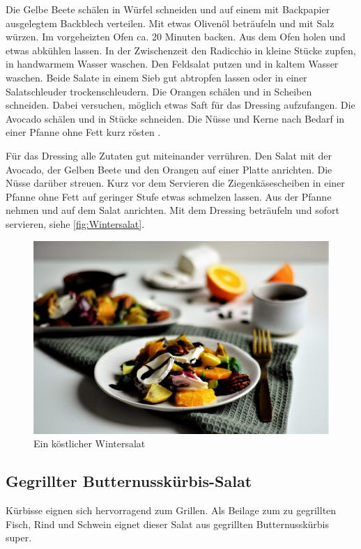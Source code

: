 Die Gelbe Beete schälen in Würfel schneiden und auf einem mit Backpapier 
ausgelegtem Backblech verteilen. Mit etwas Olivenöl beträufeln und 
mit Salz würzen. Im vorgeheizten Ofen ca. 20 Minuten backen. Aus dem Ofen 
holen und etwas abkühlen lassen. In der Zwischenzeit den Radicchio
in kleine Stücke zupfen, in handwarmem Wasser waschen. Den Feldsalat 
putzen und in kaltem Wasser waschen. Beide Salate in einem Sieb gut
abtropfen lassen oder in einer Salatschleuder trockenschleudern. Die Orangen 
schälen und in Scheiben schneiden. Dabei versuchen, möglich etwas
Saft für das Dressing aufzufangen. Die Avocado schälen und in Stücke 
schneiden. Die Nüsse und Kerne nach Bedarf in einer Pfanne ohne Fett kurz 
rösten .

Für das Dressing alle Zutaten gut miteinander verrühren. Den Salat mit der 
Avocado, der Gelben Beete und den Orangen auf einer Platte anrichten. 
Die Nüsse darüber streuen. Kurz vor dem Servieren die Ziegenkäsescheiben in 
einer Pfanne ohne Fett auf geringer Stufe etwas schmelzen lassen. 
Aus der Pfanne nehmen und auf dem Salat anrichten. Mit dem Dressing 
beträufeln und sofort servieren, siehe \vref{fig:Wintersalat}.

\begin{figure}[htbp]
	\centering
	\includegraphics[scale=.6]{pics/Wintersalat}
	\caption{Ein köstlicher Wintersalat}
	\label{fig:Wintersalat}
\end{figure}
\newpage
\subsection{Gegrillter Butternusskürbis-Salat}
Kürbisse eignen sich hervorragend zum Grillen. Als Beilage zum zu gegrillten 
Fisch, Rind und Schwein eignet dieser Salat aus gegrillten Butternusskürbis 
super.

